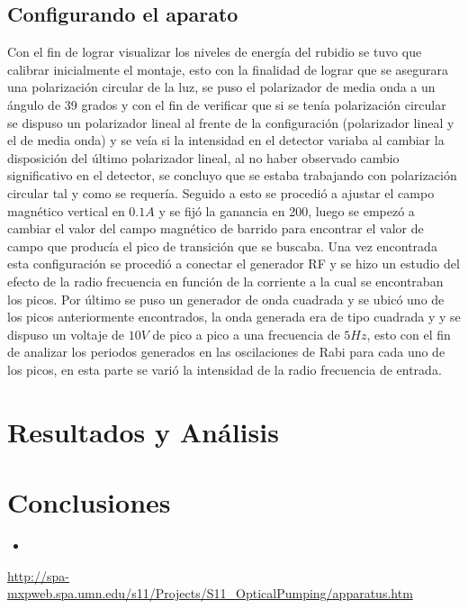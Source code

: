 \documentclass[%
 reprint,
 amsmath,amssymb,
 aps,
]{revtex4-1}
\begin{document}
\subsection{Configurando el aparato}
Con el fin de lograr visualizar los niveles de energía del rubidio se tuvo que calibrar inicialmente el montaje, esto con la finalidad de lograr que se asegurara una polarización circular de la luz, se puso el polarizador de media onda a un ángulo de 39 grados y con el fin de verificar que si se tenía polarización circular se dispuso un polarizador lineal al frente de la configuración (polarizador lineal y el de media onda) y se veía si la intensidad en el detector variaba al cambiar la disposición del último polarizador lineal, al no haber observado cambio significativo en el detector, se concluyo que se estaba trabajando con polarización circular tal y como se requería. Seguido a esto se procedió a ajustar el campo magnético vertical en $0.1A$ y se fijó la ganancia en 200, luego se empezó a cambiar el valor del campo magnético de barrido para encontrar el valor de campo que producía el pico de transición que se buscaba. Una vez encontrada esta configuración se procedió a conectar el generador RF y se hizo un estudio del efecto de la radio frecuencia en función de la corriente a la cual se encontraban los picos. Por último se puso un generador de onda cuadrada y se ubicó uno de los picos anteriormente encontrados, la onda generada era de tipo cuadrada y y se dispuso un voltaje de $10V$ de pico a pico a una frecuencia de $5Hz$, esto con el fin de analizar los periodos generados en las oscilaciones de Rabi para cada uno de los picos, en esta parte se varió la intensidad de la radio frecuencia de entrada.


\section{Resultados y Análisis}



\section{Conclusiones}
\begin{itemize}
    \item 
\end{itemize}

\begin{thebibliography}{9}
\url{http://spa-mxpweb.spa.umn.edu/s11/Projects/S11_OpticalPumping/apparatus.htm}

\end{thebibliography}
\end{document}
